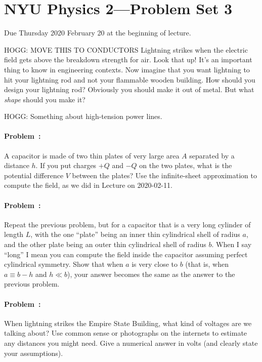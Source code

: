 \documentclass[12pt]{article}
\begin{document}
\section*{NYU Physics 2---Problem Set 3}

Due Thursday 2020 February 20 at the beginning of lecture.

\startproblem%
HOGG: MOVE THIS TO CONDUCTORS
Lightning strikes when the electric field gets above the breakdown strength
for air.
Look that up! It's an important thing to know in engineering contexts.
Now imagine that you want lightning to hit your lightning rod and not your
flammable wooden building.
How should you design your lightning rod?
Obviously you should make it out of metal.
But what \emph{shape} should you make it?

\startproblem%
HOGG: Something about high-tension power lines.

\paragraph{Problem~\theproblem:}%
A capacitor is made of two thin plates of very large area $A$
separated by a distance $h$. If you put charges $+Q$ and $-Q$ on the
two plates, what is the potential difference $V$ between the plates?
Use the infinite-sheet approximation to compute the field, as we did
in Lecture on 2020-02-11.

\paragraph{Problem~\theproblem:}%
Repeat the previous problem, but for a capacitor that is a very long
cylinder of length $L$, with the one ``plate'' being an inner thin
cylindrical shell of radius $a$, and the other plate being an outer
thin cylindrical shell of radius $b$. When I say ``long'' I mean you
can compute the field inside the capacitor assuming perfect
cylindrical symmetry. Show that when $a$ is very close to $b$ (that
is, when $a \equiv b - h$ and $h \ll b$), your answer becomes the same
as the answer to the previous problem.

\paragraph{Problem~\theproblem:}%
When lightning strikes the Empire State Building, what kind of
voltages are we talking about? Use common sense or photographs on the
internets to estimate any distances you might need. Give a numerical
answer in volts (and clearly state your assumptions).
\end{document}
